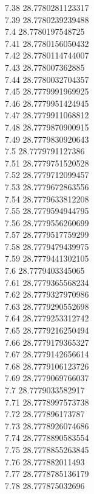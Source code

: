 {7.38	28.7780281123317\\
7.39	28.7780239239488\\
7.4	28.7780197548725\\
7.41	28.7780156050432\\
7.42	28.7780114744007\\
7.43	28.778007362885\\
7.44	28.7780032704357\\
7.45	28.7779991969925\\
7.46	28.7779951424945\\
7.47	28.7779911068812\\
7.48	28.7779870900915\\
7.49	28.7779830920643\\
7.5	28.7779791127386\\
7.51	28.7779751520528\\
7.52	28.7779712099457\\
7.53	28.7779672863556\\
7.54	28.7779633812208\\
7.55	28.7779594944795\\
7.56	28.7779556260699\\
7.57	28.7779517759299\\
7.58	28.7779479439975\\
7.59	28.7779441302105\\
7.6	28.7779403345065\\
7.61	28.7779365568234\\
7.62	28.7779327970986\\
7.63	28.7779290552698\\
7.64	28.7779253312742\\
7.65	28.7779216250494\\
7.66	28.7779179365327\\
7.67	28.7779142656614\\
7.68	28.7779106123726\\
7.69	28.7779069766037\\
7.7	28.7779033582917\\
7.71	28.7778997573738\\
7.72	28.777896173787\\
7.73	28.7778926074686\\
7.74	28.7778890583554\\
7.75	28.7778855263845\\
7.76	28.777882011493\\
7.77	28.7778785136179\\
7.78	28.777875032696\\
}
